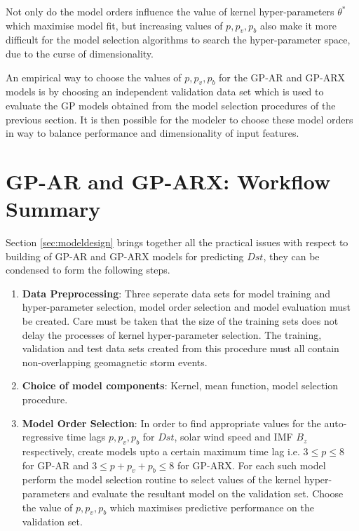 \documentclass{article}
\begin{document}
Not only do the model orders influence the value of kernel hyper-parameters $\theta^*$ which maximise model fit, but increasing values of $p, p_v, p_b$ also make it more difficult for the model selection algorithms to search the hyper-parameter space, due to the curse of dimensionality.

An empirical way to choose the values of $p, p_v, p_b$ for the GP-AR and GP-ARX models is by choosing an independent validation data set which is used to evaluate the GP models obtained from the model selection procedures of the previous section. It is then possible for the modeler to choose these model orders in way to balance performance and dimensionality of input features.

\section{GP-AR and GP-ARX: Workflow Summary}

Section \ref{sec:modeldesign} brings together all the practical issues with respect to building of GP-AR and GP-ARX models for predicting $Dst$, they can be condensed to form the following steps.

\begin{enumerate}

\item \textbf{Data Preprocessing}: Three seperate data sets for model training and hyper-parameter selection, model order selection and model evaluation must be created. Care must be taken that the size of the training sets does not delay the processes of kernel hyper-parameter selection. The training, validation and test data sets created from this procedure must all contain non-overlapping geomagnetic storm events.

\item \textbf{Choice of model components}:  Kernel, mean function, model selection procedure.

\item \textbf{Model Order Selection}: In order to find appropriate values for the auto-regressive time lags $p, p_v, p_b$ for $Dst$, solar wind speed and IMF $B_z$ respectively, create models upto a certain maximum time lag i.e. $3 \leq p \leq 8$ for GP-AR and $3 \leq p + p_v + p_b \leq 8$ for GP-ARX. For each such model perform the model selection routine to select values of the kernel hyper-parameters and evaluate the resultant model on the validation set. Choose the value of $p, p_v, p_b$ which maximises predictive performance on the validation set.

\end{enumerate}



\end{document}
